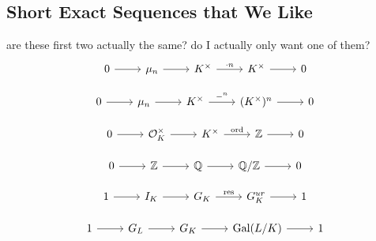\subsection{Short Exact Sequences that We Like}

{\color{red} are these first two actually the same?
do I actually only want one of them?}
\[
\begin{tikzcd}
0 \arrow{r}{} & \mu_{n} \arrow{r}{} & 
K^{\times} \arrow{r}{\cdot n} & K^{\times} \arrow{r}{} & 0
\end{tikzcd}
\]

\[
\begin{tikzcd}
0 \arrow{r}{} & \mu_{n} \arrow{r}{} & 
K^{\times} \arrow{r}{-^{n}} & (K^{\times})^{n} \arrow{r}{} & 0
\end{tikzcd}
\]

\[
\begin{tikzcd}
0 \arrow{r}{} & \mathcal{O}_{K}^{\times}  \arrow{r}{} & 
K^{\times} \arrow{r}{\text{ord}} & \mathbb{Z} \arrow{r}{} & 0
\end{tikzcd}
\]

\[
\begin{tikzcd}
0 \arrow{r}{} & \mathbb{Z} \arrow{r}{} & 
\mathbb{Q} \arrow{r}{} & \mathbb{Q} / \mathbb{Z} \arrow{r}{} & 0
\end{tikzcd}
\]

\[
\begin{tikzcd}
1 \arrow{r}{} & I_{K} \arrow{r}{} & 
\gk \arrow{r}{\text{res}} & \gkur \arrow{r}{} & 1
\end{tikzcd}
\]

\[
\begin{tikzcd}
	1 \arrow{r}{} & \absgal{L} \arrow{r}{} & 
	\gk \arrow{r}{} & \Gal(L / K) \arrow{r}{} & 1
\end{tikzcd}
\]

